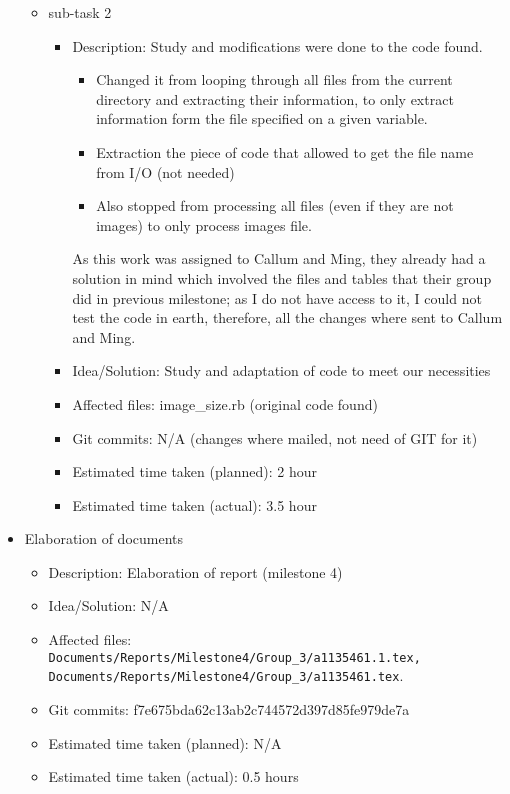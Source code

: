 \documentclass{article}
\begin{document}
\begin{itemize}
\begin{itemize}
                \item sub-task 2
                \begin{itemize}
                    \item Description: Study and modifications were done to the code found.  
                    \begin{itemize}
                     \item Changed it from looping through all files from the current directory and extracting their information, to only extract information form the file specified on a given variable.
                     \item Extraction the piece of code that allowed to get the file name from I/O (not needed)
                     \item Also stopped from processing all files (even if they are not images) to only process images file.
                    \end{itemize}
                    As this work was assigned to Callum and Ming, they already had a solution in mind which involved the files and tables that their group did in previous milestone; as I do not have access to it, I could not test the code in earth, therefore, all the changes where sent to Callum and Ming.
                    \item Idea/Solution: Study and adaptation of code to meet our necessities
                    \item Affected files: image\_size.rb (original code found)
                    \item Git commits: N/A (changes where mailed, not need of GIT for it)
                    \item Estimated time taken (planned): 2 hour
                    \item Estimated time taken (actual): 3.5 hour
                \end{itemize}
            \end{itemize}
       
                
	\item Elaboration of documents
	     \begin{itemize}
	         \item Description: Elaboration of report (milestone 4)
	         \item Idea/Solution: N/A
	         \item Affected files: \texttt{Documents/Reports/Milestone4/Group\_3/a1135461.1.tex, Documents/Reports/Milestone4/Group\_3/a1135461.tex}.  
	         \item Git commits: f7e675bda62c13ab2c744572d397d85fe979de7a
		 \item Estimated time taken (planned): N/A
	         \item Estimated time taken (actual): 0.5 hours 
	     \end{itemize}
\end{itemize}
\end{document}

